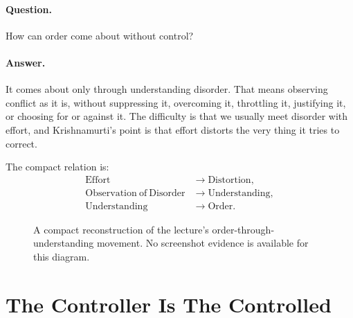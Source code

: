 \paragraph{Question.}
How can order come about without control?

\paragraph{Answer.}
It comes about only through understanding disorder. That means observing conflict as it is, without suppressing it, overcoming it, throttling it, justifying it, or choosing for or against it. The difficulty is that we usually meet disorder with effort, and Krishnamurti's point is that effort distorts the very thing it tries to correct.

The compact relation is:
\begin{align}
\mathrm{Effort} &\longrightarrow \mathrm{Distortion},\\
\mathrm{Observation\ of\ Disorder} &\longrightarrow \mathrm{Understanding},\\
\mathrm{Understanding} &\longrightarrow \mathrm{Order}.
\end{align}

\begin{figure}
\centering
{}
\caption{A compact reconstruction of the lecture's order-through-understanding movement. No screenshot evidence is available for this diagram.}
\end{figure}

\section{The Controller Is The Controlled}

